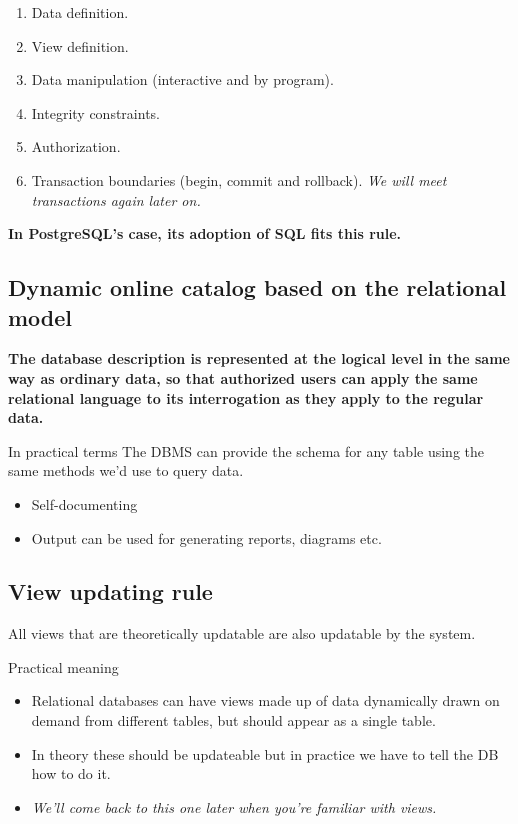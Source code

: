 \documentclass[slides]{pgnotes}
\begin{document}
\begin{enumerate}
\item Data definition.
\item View definition.
\item Data manipulation (interactive and by program).
\item Integrity constraints.
\item Authorization.
\item Transaction boundaries (begin, commit and rollback). \textit{We will meet transactions again later on.}
\end{enumerate}

\textbf{In PostgreSQL's case, its adoption of SQL fits this rule.}


  
\subsection{Dynamic online catalog based on the relational model}

\textbf{The database description is represented at the logical level in the same way as ordinary data, so that authorized users can apply the same relational language to its interrogation as they apply to the regular data.}

\begin{greenbox}{In practical terms}
  The DBMS can provide the schema for any table using the same methods we'd use to query data.
  \begin{itemize}
  \item Self-documenting 
  \item Output can be used for generating reports, diagrams etc.
  \end{itemize}
\end{greenbox}


\subsection{View updating rule}
  All views that are theoretically updatable are also updatable by the system.

  \begin{greenbox}{Practical meaning}
    \begin{itemize}
    \item Relational databases can have views made up of data dynamically drawn on demand from different tables, but should appear as a single table.
    \item In theory these should be updateable but in practice we have to tell the DB how to do it.
    \item \textit{We'll come back to this one later when you're familiar with views.}
    \end{itemize}
  \end{greenbox}
  
\end{document}
